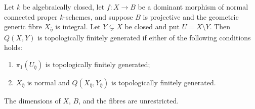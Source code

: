 \begin{proposition}
\label{D:projective-base-generation}
Let $k$ be algebraically closed, let $f:X\to B$ be a
dominant morphism of normal connected proper $k$-schemes,
and suppose $B$ is projective and the geometric generic
fibre $X_{\overline\eta}$ is integral.  Let
$Y\subsetneq X$ be closed and put $U=X\setminus Y$.
Then $Q(X,Y)$ is topologically finitely generated if either
of the following conditions holds:
\begin{enumerate}
\item $\pi_1(U_{\overline\eta})$ is topologically finitely
generated;
\item $X_{\overline\eta}$ is normal and
$Q(X_{\overline\eta},Y_{\overline\eta})$ is topologically
finitely generated.
\end{enumerate}
The dimensions of $X$, $B$, and the fibres are unrestricted.
\end{proposition}
